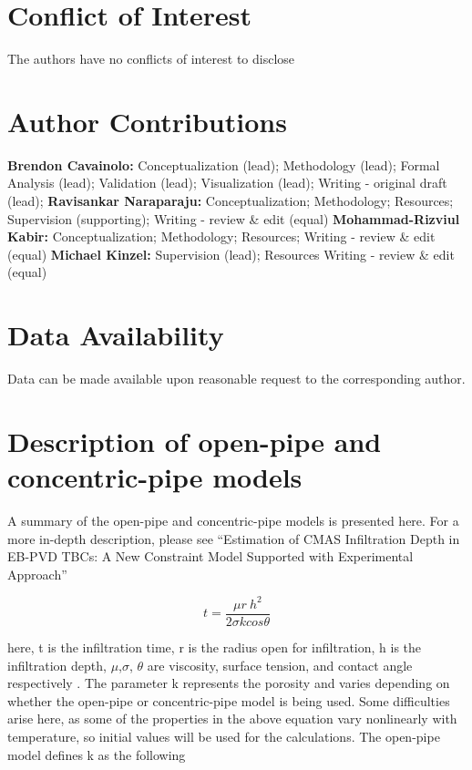 \documentclass[%
 aip,
 amsmath,amssymb,
 reprint,%
]{revtex4-1}
\begin{document}
\section*{Conflict of Interest}
The authors have no conflicts of interest to disclose

\section*{Author Contributions}
\textbf{Brendon Cavainolo:} Conceptualization (lead); Methodology (lead); Formal Analysis (lead); Validation (lead); Visualization (lead); Writing - original draft (lead);
\textbf{Ravisankar Naraparaju:} Conceptualization; Methodology; Resources; Supervision (supporting); Writing - review \& edit (equal)
\textbf{Mohammad-Rizviul Kabir:} Conceptualization; Methodology; Resources; Writing - review \& edit (equal)
\textbf{Michael Kinzel:} Supervision (lead); Resources Writing - review \& edit (equal)


\section*{Data Availability}
Data can be made available upon reasonable request to the corresponding author.

\appendix
\section{Description of open-pipe and concentric-pipe models}
\label{sec:app:RaviPipeModels}
A summary of the open-pipe and concentric-pipe models is presented here. For a more in-depth description, please see ``Estimation
of CMAS Infiltration Depth in EB-PVD TBCs: A New Constraint Model Supported with Experimental Approach''

\begin{equation}
    t=\frac{\mu r\ h^2}{2\sigma k cos\theta}
    \label{eq:PM_base}
\end{equation}

\noindent here, t is the infiltration time, r is the radius open for infiltration, h is the infiltration depth, $\mu$,$ \sigma$, $\theta$ are viscosity, surface tension, and contact angle respectively \cite{Naraparaju2017,ZHAO201474}. The parameter k represents the porosity and varies depending on whether the open-pipe or concentric-pipe model is being used. Some difficulties arise here, as some of the properties in the above equation vary nonlinearly with temperature, so initial values will be used for the calculations. The open-pipe model defines k as the following
\end{document}
